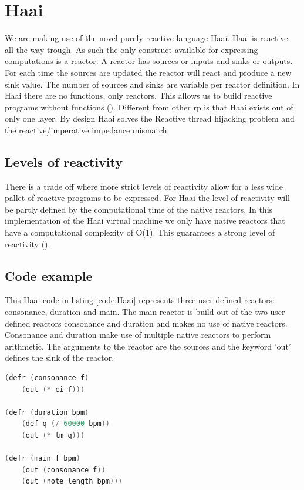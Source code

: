\documentclass[a4paper]{book}
\begin{document}
\section{Haai}
We are making use of the novel purely reactive language Haai. Haai is reactive all-the-way-trough. As such the only construct available for expressing computations is a reactor. A reactor has sources or inputs and sinks or outputs. For each time the sources are updated the reactor will react and produce a new sink value. The number of sources and sinks are variable per reactor definition. In Haai there are no functions, only reactors. This allows us to build reactive programs without functions (\cite{oeyen_reactive_2024}). Different from other rp is that Haai exists out of only one layer. By design Haai solves the Reactive thread hijacking problem and the reactive/imperative impedance mismatch. 

\subsection*{Levels of reactivity}
There is a trade off where more strict levels of reactivity allow for a less wide pallet of reactive programs to be expressed. For Haai the level of reactivity will be partly defined by the computational time of the native reactors. In this implementation of the Haai virtual machine we only have native reactors that have a computational complexity of O(1). This guarantees a strong level of reactivity (\cite{oeyen_reactive_2024}).

\subsection*{Code example}
This Haai code in listing \ref{code:Haai} represents three user defined reactors: consonance, duration and main. The main reactor is build out of the two user defined reactors consonance and duration and makes no use of native reactors. Consonance and duration make use of multiple native reactors to perform arithmetic. The arguments to the reactor are the sources and the keyword 'out' defines the sink of the reactor.

\begin{lstlisting}[language=C, caption={Haai code}, label={code:Haai}, basicstyle=\ttfamily, frame=single]
(defr (consonance f)
	(out (* ci f)))

(defr (duration bpm)
	(def q (/ 60000 bpm))
	(out (* lm q)))

(defr (main f bpm)
	(out (consonance f))
	(out (note_length bpm)))
	
\end{lstlisting}
\end{document}

